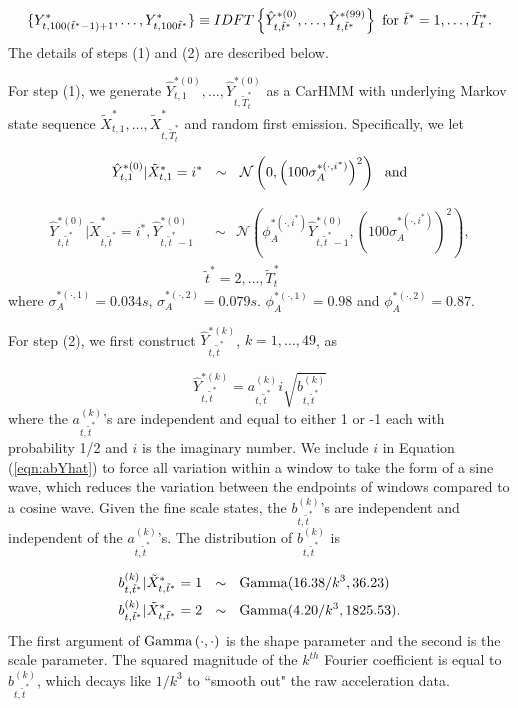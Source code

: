 \[
    \{Y^*_{t,100(\tilde t^* - 1) + 1},\ldots,Y^*_{t,100\tilde t^*}\} \equiv IDFT\left\{\hat{Y}^{*(0)}_{t,\tilde t^*},
    \ldots, \hat{Y}^{*(99)}_{t,\tilde t^*}\right\}
    {\rm{~for~}} \tilde t^* = 1,\ldots,\tilde T^*_t.
\]
The details of steps (1) and (2) are described below.

For step (1), we generate $\hat Y^{*(0)}_{t,1}, \ldots, \hat Y^{*(0)}_{t,\tilde T_t^*}$ as a CarHMM with underlying Markov state sequence $\tilde X^{*}_{t,1}, \ldots, \tilde X^{*}_{t,\tilde T_t^*}$ and random first emission. Specifically, we let

   \[
    	\hat{Y}^{*(0)}_{t,1}|\tilde X^*_{t,1} = i^* ~~\sim~~ \mathcal{N} \left(0, \left(100\sigma_A^{*(\cdot,i^*)}\right)^2 \right)
    	~~{\rm{and}}
   \]
   
    \begin{align}	
       \hat{Y}^{*(0)}_{t,\tilde t^*}|\tilde X^*_{t,\tilde t^*} = i^*,\hat{Y}^{*(0)}_{t,\tilde t^*-1}
       &~~\sim ~~\mathcal{N} \left(\phi_A^{*(\cdot,i^*)} \hat{Y}^{*(0)}_{t,\tilde t^*-1}, \left(100\sigma_A^{*(\cdot,i^*)}\right)^2 \right), \label{eqn:yhat_0} \\
        &\tilde t^* = 2,\ldots, \tilde T^*_t
    	\nonumber
    \end{align}
    where $\sigma_A^{*(\cdot,1)} = 0.034s$,  $\sigma_A^{*(\cdot,2)} = 0.079s$. $\phi_A^{*(\cdot,1)} = 0.98$ and $\phi_A^{*(\cdot,2)} = 0.87$. 
  
 For step (2),
 we first construct $\hat{Y}^{*(k)}_{t,\tilde t^*}$, $k=1,\ldots, 49$, as
 
    \begin{equation}
        \hat{Y}^{*(k)}_{t,\tilde t^*} = a_{t,\tilde t^*}^{(k)} i\sqrt{b^{(k)}_{t,\tilde t^*}}
        \label{eqn:abYhat}
    \end{equation}
    where the $a^{(k)}_{t,\tilde t^*}$'s are independent and equal to either 1 or -1 each with probability 1/2 and $i$ is the imaginary number. We include $i$ in Equation (\ref{eqn:abYhat}) to force all variation within a window to take the form of a sine wave, which reduces the variation between the endpoints of windows compared to a cosine wave.
    Given the fine scale states, the $b^{(k)}_{t,\tilde t^*}$'s are independent and independent of the  $a^{(k)}_{t,\tilde t^*}$'s.  
   The distribution of $b^{(k)}_{t,\tilde t^*}$ is
   
    \begin{align}
    \begin{split}
    	b^{(k)}_{t,\tilde t^*}|\tilde X^*_{t,\tilde t^*} = 1 &~~\sim~~ {\rm{Gamma}}(16.38/k^3, 36.23) \\
    	b^{(k)}_{t,\tilde t^*}|\tilde X^*_{t,\tilde t^*} = 2  &~~\sim ~~{\rm{Gamma}}(4.20/k^3, 1825.53). \\ 
    \end{split}
    \label{eqn:bdist}
    \end{align}
    The first argument of ${\rm{Gamma}}\left(\cdot,\cdot\right)$ is the shape parameter and the second is the scale parameter. The squared magnitude of the $k^{th}$ Fourier coefficient is equal to $b^{(k)}_{t,\tilde t^*}$, which decays like $1/k^3$ to ``smooth out" the raw acceleration data.
    
